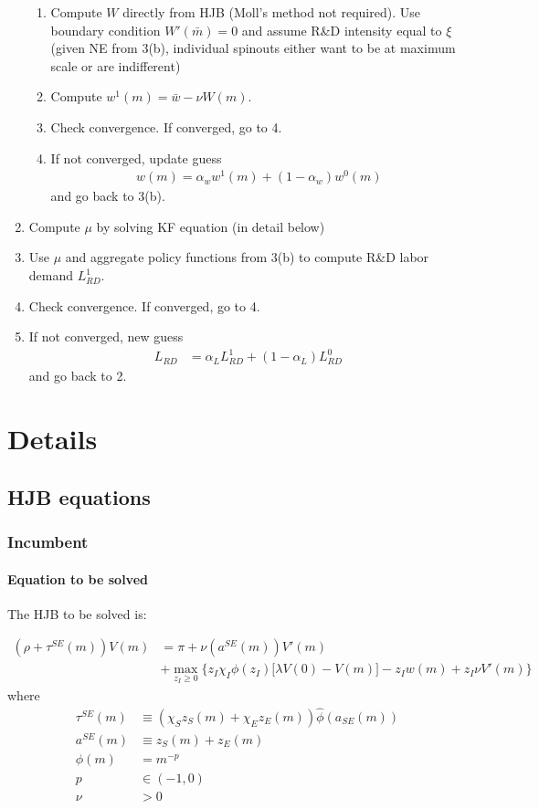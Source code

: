 \documentclass[12pt,english]{article}
\theoremstyle{remark}
\begin{document}
\begin{enumerate}
\begin{enumerate}
		\item Compute $W$ directly from HJB (Moll's method not required). Use boundary condition $W'(\bar{m}) = 0$ and assume R\&D intensity equal to $\xi$ (given NE from 3(b), individual spinouts either want to be at maximum scale or are indifferent)
		\item Compute $w^1(m) =  \bar{w} - \nu W(m)$.
		\item Check convergence. If converged, go to 4. 
		\item If not converged, update guess 
		\begin{align*}
			w(m) = \alpha_w w^1(m) + (1-\alpha_w) w^0 (m) 
		\end{align*} 
		and go back to 3(b).
	\end{enumerate}
	\item Compute $\mu$ by solving KF equation (in detail below) 
	\item Use $\mu$ and aggregate policy functions from 3(b) to compute R\&D labor demand $L^1_{RD}$.
	\item Check convergence. If converged, go to 4. 
	\item If not converged, new guess
	\begin{align*}
	L_{RD} &= \alpha_L L^1_{RD} + (1-\alpha_L) L^0_{RD} 
	\end{align*}
	and go back to 2. 
\end{enumerate}

\section{Details}

\subsection{HJB equations}

\subsubsection{Incumbent}

\paragraph{Equation to be solved}The HJB to be solved is: 

\begin{align*}
	(\rho + \tau^{SE}(m)) V(m) &= \pi + \nu (a^{SE}(m))V'(m) \\
							   &+ \max_{z_I \ge 0} \Big\{ z_I \chi_I \phi(z_I) \big[ \lambda V(0) - V(m) \big] - z_I w(m) + z_I \nu  V'(m) \Big\}
\end{align*}
where
\begin{align*}
	\tau^{SE}(m) &\equiv (\chi_S z_S(m) + \chi_E z_E(m)) \hat{\phi}(a_{SE}(m)) \\
	a^{SE}(m) &\equiv z_S(m) + z_E(m) \\
	\phi(m) &= m^{-p} \\
	p &\in (-1,0) \\
	\nu &> 0
\end{align*}
\end{document}
